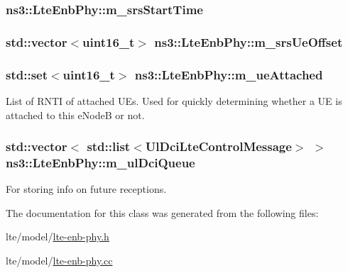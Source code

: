 \subsubsection[{\texorpdfstring{m\+\_\+srs\+Start\+Time}{m_srsStartTime}}]{ ns3\+::\+Lte\+Enb\+Phy\+::m\+\_\+srs\+Start\+Time\hspace{0.3cm}{\ttfamily [private]}}\hypertarget{classns3_1_1LteEnbPhy_a019eaaa6cca7396f9b89fdb5125713e9}{}\label{classns3_1_1LteEnbPhy_a019eaaa6cca7396f9b89fdb5125713e9}
\subsubsection[{\texorpdfstring{m\+\_\+srs\+Ue\+Offset}{m_srsUeOffset}}]{\setlength{\rightskip}{0pt plus 5cm}std\+::vector$<$uint16\+\_\+t$>$ ns3\+::\+Lte\+Enb\+Phy\+::m\+\_\+srs\+Ue\+Offset\hspace{0.3cm}{\ttfamily [private]}}\hypertarget{classns3_1_1LteEnbPhy_aed120277d3a531a9ccfe9c69cf1636fb}{}\label{classns3_1_1LteEnbPhy_aed120277d3a531a9ccfe9c69cf1636fb}
\subsubsection[{\texorpdfstring{m\+\_\+ue\+Attached}{m_ueAttached}}]{\setlength{\rightskip}{0pt plus 5cm}std\+::set$<$uint16\+\_\+t$>$ ns3\+::\+Lte\+Enb\+Phy\+::m\+\_\+ue\+Attached\hspace{0.3cm}{\ttfamily [private]}}\hypertarget{classns3_1_1LteEnbPhy_a226e8d8e856ac3b90d45db11bbe23400}{}\label{classns3_1_1LteEnbPhy_a226e8d8e856ac3b90d45db11bbe23400}
List of R\+N\+TI of attached U\+Es. Used for quickly determining whether a UE is attached to this e\+NodeB or not. 
\subsubsection[{\texorpdfstring{m\+\_\+ul\+Dci\+Queue}{m_ulDciQueue}}]{\setlength{\rightskip}{0pt plus 5cm}std\+::vector$<$ {\bf std\+::list}$<${\bf Ul\+Dci\+Lte\+Control\+Message}$>$ $>$ ns3\+::\+Lte\+Enb\+Phy\+::m\+\_\+ul\+Dci\+Queue\hspace{0.3cm}{\ttfamily [private]}}\hypertarget{classns3_1_1LteEnbPhy_a6c2e4f7f8dd477785e3f26244474f277}{}\label{classns3_1_1LteEnbPhy_a6c2e4f7f8dd477785e3f26244474f277}


For storing info on future receptions. 



The documentation for this class was generated from the following files\+:\begin{DoxyCompactItemize}
\item 
lte/model/\hyperlink{lte-enb-phy_8h}{lte-\/enb-\/phy.\+h}\item 
lte/model/\hyperlink{lte-enb-phy_8cc}{lte-\/enb-\/phy.\+cc}\end{DoxyCompactItemize}
